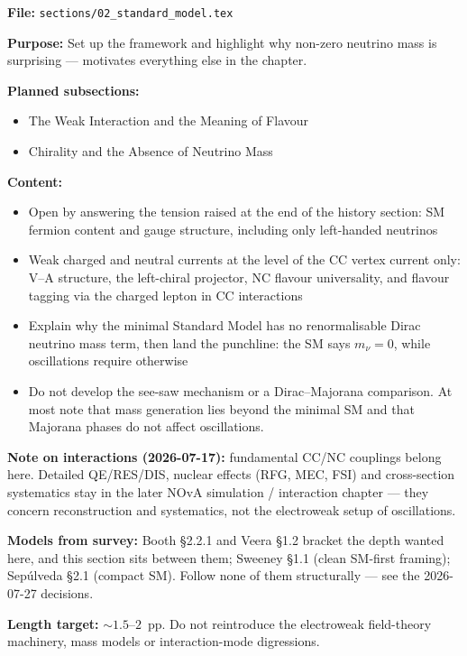 \documentclass[11pt]{article}
\begin{document}
\textbf{File:} \texttt{sections/02\_standard\_model.tex}

\textbf{Purpose:} Set up the framework and highlight why non-zero neutrino mass is surprising ---
motivates everything else in the chapter.

\textbf{Planned subsections:}
\begin{itemize}
    \item The Weak Interaction and the Meaning of Flavour
    \item Chirality and the Absence of Neutrino Mass
\end{itemize}

\textbf{Content:}
\begin{itemize}
    \item Open by answering the tension raised at the end of the history section: SM fermion
    content and gauge structure, including only left-handed neutrinos
    \item Weak charged and neutral currents at the level of the CC vertex current only: V--A
    structure, the left-chiral projector, NC flavour universality, and flavour tagging via the
    charged lepton in CC interactions
    \item Explain why the minimal Standard Model has no renormalisable Dirac neutrino mass term,
    then land the punchline: the SM says $m_\nu = 0$, while oscillations require otherwise
    \item Do not develop the see-saw mechanism or a Dirac--Majorana comparison. At most note that
    mass generation lies beyond the minimal SM and that Majorana phases do not affect oscillations.
\end{itemize}

\textbf{Note on interactions (2026-07-17):} fundamental CC/NC couplings belong here. Detailed
QE/RES/DIS, nuclear effects (RFG, MEC, FSI) and cross-section systematics stay in the later
NOvA simulation / interaction chapter --- they concern reconstruction and systematics, not the
electroweak setup of oscillations.

\textbf{Models from survey:} Booth \S2.2.1 and Veera \S1.2 bracket the depth wanted here, and
this section sits between them; Sweeney \S1.1 (clean SM-first framing); Sep\'ulveda \S2.1
(compact SM). Follow none of them structurally --- see the 2026-07-27 decisions.

\textbf{Length target:} $\sim 1.5$--$2$~pp. Do not reintroduce the electroweak field-theory
machinery, mass models or interaction-mode digressions.
\end{document}
